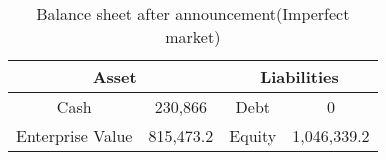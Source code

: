 \begin{table}[ht]
\centering
\begin{tabular}{@{}cccc@{}}
\toprule
\multicolumn{2}{c}{Asset}  & \multicolumn{2}{c}{Liabilities} \\ \midrule
Cash             & 230,866 & Debt           & 0              \\
Enterprise Value & 815,473.2 & Equity         & 1,046,339.2        \\ \bottomrule
\end{tabular}
\caption{Balance sheet after announcement(Imperfect market)}
\label{tab:bs_after_announcement_imperfect}
\end{table}
